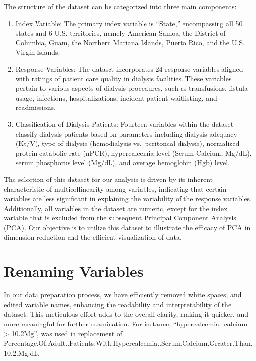 \documentclass[
  letterpaper,
  DIV=11,
  numbers=noendperiod]{scrreprt}
\providecommand{\tightlist}{%
  \setlength{\itemsep}{0pt}\setlength{\parskip}{0pt}}\usepackage{longtable,booktabs,array}
\begin{document}
The structure of the dataset can be categorized into three main
components:

\begin{enumerate}
\def\labelenumi{\arabic{enumi}.}
\tightlist
\item
  Index Variable: The primary index variable is ``State,'' encompassing
  all 50 states and 6 U.S. territories, namely American Samoa, the
  District of Columbia, Guam, the Northern Mariana Islands, Puerto Rico,
  and the U.S. Virgin Islands.
\item
  Response Variables: The dataset incorporates 24 response variables
  aligned with ratings of patient care quality in dialysis facilities.
  These variables pertain to various aspects of dialysis procedures,
  such as transfusions, fistula usage, infections, hospitalizations,
  incident patient waitlisting, and readmissions.
\item
  Classification of Dialysis Patients: Fourteen variables within the
  dataset classify dialysis patients based on parameters including
  dialysis adequacy (Kt/V), type of dialysis (hemodialysis
  vs.~peritoneal dialysis), normalized protein catabolic rate (nPCR),
  hypercalcemia level (Serum Calcium, Mg/dL), serum phosphorus level
  (Mg/dL), and average hemoglobin (Hgb) level.
\end{enumerate}

The selection of this dataset for our analysis is driven by its inherent
characteristic of multicollinearity among variables, indicating that
certain variables are less significant in explaining the variability of
the response variables. Additionally, all variables in the dataset are
numeric, except for the index variable that is excluded from the
subsequent Principal Component Analysis (PCA). Our objective is to
utilize this dataset to illustrate the efficacy of PCA in dimension
reduction and the efficient visualization of data.

\hypertarget{renaming-variables}{%
\section{Renaming Variables}\label{renaming-variables}}

In our data preparation process, we have efficiently removed white
spaces, and edited variable names, enhancing the readability and
interpretability of the dataset. This meticulous effort adds to the
overall clarity, making it quicker, and more meaningful for further
examination. For instance, ``hypercalcemia\_calcium \textgreater{}
10.2Mg'', was used in replacement of
Percentage.Of.Adult..Patients.With.Hypercalcemia..Serum.Calcium.Greater.Than.10.2.Mg.dL.
\end{document}
